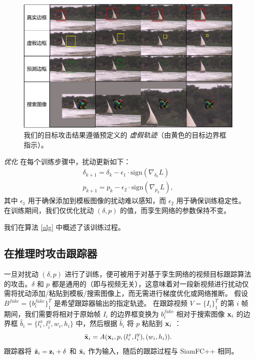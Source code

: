 \begin{figure}[t]
\centering
\includegraphics[width=1.0\textwidth]{Img/attack/vis_v4.pdf}
\caption{我们的目标攻击结果遵循预定义的 \textit{虚假轨迹}（由黄色的目标边界框指示）。}
\label{fig:vis}
\end{figure}

\textit{优化} 在每个训练步骤中，扰动更新如下：
\begin{gather}
\delta_{k+1} = \delta_{k} - \epsilon_1 \cdot \text{sign}(\nabla_{\delta_k}L)\\
p_{k+1} = p_{k} - \epsilon_2 \cdot \text{sign}(\nabla_{p_k}L),
\end{gather}
其中 $\epsilon_1$ 用于确保添加到模板图像的扰动难以感知，而 $\epsilon_2$ 用于确保训练稳定性。
在训练期间，我们仅优化扰动 $(\delta, p)$ 的值，而孪生网络的参数保持不变。

我们在算法 \ref{alg} 中概述了该训练过程。

\subsection{在推理时攻击跟踪器}

一旦对扰动 $(\delta, p)$ 进行了训练，便可被用于对基于孪生网络的视频目标跟踪算法的攻击。$\delta$ 和 $p$ 都是通用的（即与视频无关），这意味着对一段新视频进行扰动仅需将扰动添加/粘贴到模板/搜索图像上，而无需进行梯度优化或网络推断。
假设 $B^{fake}=\{b^{fake}_i\}_1^{T}$ 是希望跟踪器输出的指定轨迹。
在跟踪视频 $V=\{I_i\}_1^T$ 的第 $i$ 帧期间，我们需要将相对于原始帧 $I_i$ 的边界框变换为 $b^{fake}_i$ 相对于搜索图像 $\textbf x_i$ 的边界框 $\hat b_i=\{l^x_i, l^y_i, w_i, h_i\}$ 中，然后根据 $\hat b_i$ 将 $p$ 粘贴到 $\textbf x_i$ ：
\begin{equation}
\tilde{\textbf x}_i = A(\textbf x_i, p, (l^x_i, l^y_i), (w_i, h_i)).
\end{equation}
跟踪器将 $\tilde{\textbf z}_i=\textbf z_i+\delta$ 和 $\tilde{\textbf x}_i$ 作为输入，随后的跟踪过程与 SiamFC++ 相同。

